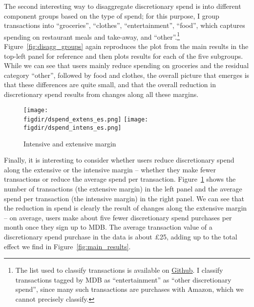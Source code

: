 The second interesting way to disaggregate discretionary spend is into
different component groups based on the type of spend; for this purpose, I
group transactions into ``groceries'', ``clothes'', ``entertainment'',
``food'', which captures spending on restaurant meals and take-away, and
``other''.\footnote{The list used to classify transactions is available on
    \href{https://github.com/fabiangunzinger/mdb_eval/blob/f31bfcd7a330188cdd27968d41957ebf5b454099/src/data/aggregators.py\#L389}{Github}.
    I classify transactions tagged by MDB as ``entertainment'' as ``other
discretionary spend'', since many such transactions are purchases with Amazon,
which we cannot precisely classify.} Figure~\ref{fig:disagg_groups} again
reproduces the plot from the main results in the top-left panel for reference
and then plots results for each of the five subgroups. While we can see that users
mainly reduce spending on groceries and the residual category ``other'',
followed by food and clothes, the overall picture that emerges is that these
differences are quite small, and that the overall reduction in discretionary
spend results from changes along all these margins.

\begin{figure}[h]
    \centering
    \caption{Intensive and extensive margin}%
    \label{fig:int_ext_results}
    \texttt{[image: \\figdir/dspend\_extens\_es.png]}
    \texttt{[image: \\figdir/dspend\_intens\_es.png]}
\end{figure}

Finally, it is interesting to consider whether users reduce discretionary spend
along the extensive or the intensive margin -- whether they make fewer
transactions or reduce the average spend per transaction.
Figure~\ref{fig:int_ext_results} shows the number of transactions (the
extensive margin) in the left panel and the average spend per transaction (the
intensive margin) in the right panel. We can see that the reduction in spend is
clearly the result of changes along the extensive margin -- on average, users
make about five fewer discretionary spend purchases per month once they sign up
to MDB. The average transaction value of a discretionary spend purchase in the
data is about \pounds25, adding up to the total effect we find in
Figure~\ref{fig:main_results}.

